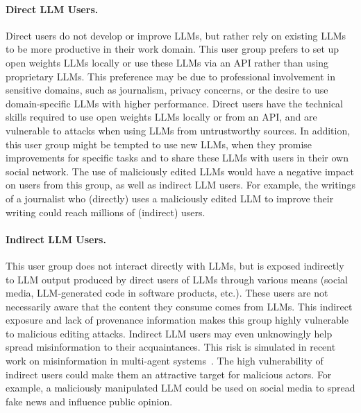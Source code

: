 \paragraph{Direct LLM Users.} 
Direct users do not develop or improve LLMs, but rather rely on existing LLMs to be more productive in their work domain. 
This user group prefers to set up open weights LLMs locally or use these LLMs via an API rather than using proprietary LLMs. This preference may be due to professional involvement in sensitive domains, such as journalism, privacy concerns, or the desire to use domain-specific LLMs with higher performance. Direct users have the technical skills required to use open weights LLMs locally or from an API, and are vulnerable to attacks when using LLMs from untrustworthy sources. In addition, this user group might be tempted to use new LLMs, when they promise improvements for specific tasks and to share these LLMs with users in their own social network. 
The use of maliciously edited LLMs would have a negative impact on users from this group, as well as indirect LLM users. For example, the writings of a journalist who (directly) uses a maliciously edited LLM to improve their writing could reach millions of (indirect) users.

\paragraph{Indirect LLM Users.} 
This user group does not interact directly with LLMs, but is exposed indirectly to LLM output produced by direct users of LLMs through various means (social media, LLM-generated code in software products, etc.). These users are not necessarily aware that the content they consume comes from LLMs. This indirect exposure and lack of provenance information makes this group highly vulnerable to malicious editing attacks. Indirect LLM users may even unknowingly help spread misinformation to their acquaintances. This risk is simulated in recent work on misinformation in multi-agent systems~\cite{ju-etal-2024-flooding}. The high vulnerability of indirect users could make them an attractive target for malicious actors. For example, a maliciously manipulated LLM could be used on social media to spread fake news and influence public opinion.








